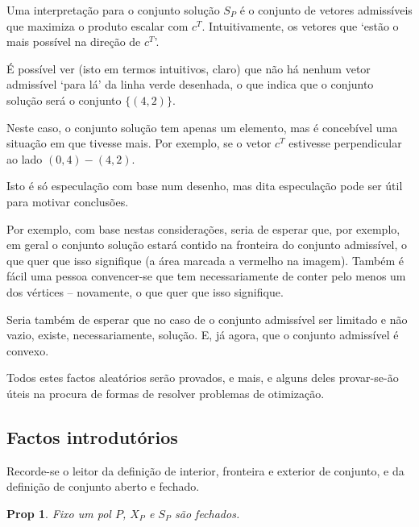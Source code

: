 \documentclass{article}
\newtheorem{prop}{Prop}
\theoremstyle{definition}
\begin{document}
	Uma interpretação para o conjunto solução $S_P$ é o conjunto de vetores admissíveis que maximiza o produto escalar com $c^T$. Intuitivamente, os vetores que `estão o mais possível na direção de $c^T$'.
	
	É possível ver (isto em termos intuitivos, claro) que não há nenhum vetor admissível `para lá' da linha verde desenhada, o que indica que o conjunto solução será o conjunto $\{(4,2)\}$.
	
	Neste caso, o conjunto solução tem apenas um elemento, mas é concebível uma situação em que tivesse mais. Por exemplo, se o vetor $c^T$ estivesse perpendicular ao lado $(0,4)-(4,2)$.
	
	Isto é só especulação com base num desenho, mas dita especulação pode ser útil para motivar conclusões.
	
	Por exemplo, com base nestas considerações, seria de esperar que, por exemplo, em geral o conjunto solução estará contido na fronteira do conjunto admissível, o que quer que isso signifique (a área marcada a vermelho na imagem). Também é fácil uma pessoa convencer-se que tem necessariamente de conter pelo menos um dos vértices -- novamente, o que quer que isso signifique.
	
	Seria também de esperar que no caso de o conjunto admissível ser limitado e não vazio, existe, necessariamente, solução. E, já agora, que o conjunto admissível é convexo.
	
	Todos estes factos aleatórios serão provados, e mais, e alguns deles provar-se-ão úteis na procura de formas de resolver problemas de otimização.
	
	\subsection{Factos introdutórios}
	
	Recorde-se o leitor da definição de interior, fronteira e exterior de conjunto, e da definição de conjunto aberto e fechado.
	
	\begin{prop}
		Fixo um pol $P$, $X_P$ e $S_P$ são fechados.
	\end{prop}
	
\end{document}
